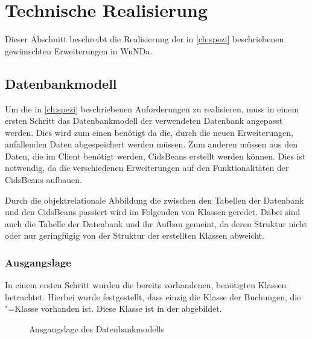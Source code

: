 

\section{Technische Realisierung}
Dieser Abschnitt beschreibt die Realisierung der in \autoref{ch:spezi} beschriebenen gewünschten Erweiterungen in \ac{WuNDa}.

\subsection{Datenbankmodell}
Um die in \autoref{ch:spezi} beschriebenen Anforderungen zu realisieren, muss in einem ersten Schritt das Datenbankmodell der verwendeten Datenbank angepasst werden.
Dies wird zum einen benötigt da die, durch die neuen Erweiterungen, anfallenden Daten abgespeichert werden müssen. Zum anderen müssen aus den Daten, die im Client benötigt werden, CidsBeans erstellt werden können. Dies ist notwendig, da die verschiedenen Erweiterungen auf den Funktionalitäten der CidsBeans aufbauen.

Durch die objektrelationale Abbildung die zwischen den Tabellen der Datenbank und den CidsBeans passiert wird im Folgenden von Klassen geredet.
Dabei sind auch die Tabelle der Datenbank und ihr Aufbau gemeint, da deren Struktur nicht oder nur geringfügig von der Struktur der erstellten Klassen abweicht.

\subsubsection{Ausgangslage}
In einem ersten Schritt wurden die bereits vorhandenen, benötigten Klassen betrachtet. Hierbei wurde festgestellt, dass einzig die Klasse der Buchungen, die "=Klasse vorhanden ist. Diese Klasse ist in der  abgebildet.
\begin{figure}[htb]
	\centering
	\caption{Ausgangslage des Datenbankmodells}
	\label{fig:db-billing}
\end{figure}

